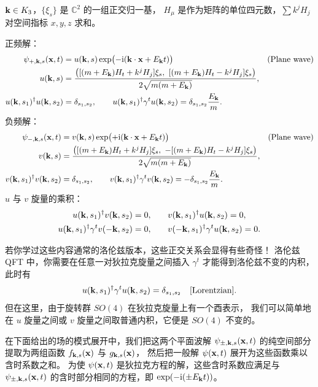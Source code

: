 \begin{keybox}
$\mathbf{k}\in K_{3}$，$\{\xi_{s}\}$ 是 $\mathbb{C}^{2}$ 的一组正交归一基，
$H_{\mu}$ 是作为矩阵的单位四元数，$\sum k^{j}H_{j}$ 对空间指标 $x,y,z$ 求和。

正频解：
\begin{align*}
\psi_{+,\mathbf{k},s}(\mathbf{x},t)&=u(\mathbf{k},s)\exp\bigl(-\mathrm{i}(\mathbf{k}\cdot\mathbf{x}+E_{\mathbf{k}}t)\bigr)
&&\text{(Plane wave)}\\
u(\mathbf{k},s)&=\frac{\bigl([(m+E_{\mathbf{k}})H_{t}+k^{j}H_{j}]\xi_{s},\
[(m+E_{\mathbf{k}})H_{t}-k^{j}H_{j}]\xi_{s}\bigr)}{2\sqrt{m(m+E_{\mathbf{k}})}},\\
u(\mathbf{k},s_{1})^{\dagger}u(\mathbf{k},s_{2})&=\delta_{s_{1},s_{2}},\qquad
u(\mathbf{k},s_{1})^{\dagger}\gamma^{t}u(\mathbf{k},s_{2})=\delta_{s_{1},s_{2}}\frac{E_{\mathbf{k}}}{m}.
\end{align*}
负频解：
\begin{align*}
\psi_{-,\mathbf{k},s}(\mathbf{x},t)&=v(\mathbf{k},s)\exp\bigl(+\mathrm{i}(\mathbf{k}\cdot\mathbf{x}+E_{\mathbf{k}}t)\bigr)
&&\text{(Plane wave)}\\
v(\mathbf{k},s)&=\frac{\bigl([(m+E_{\mathbf{k}})H_{t}+k^{j}H_{j}]\xi_{s},\
-[(m+E_{\mathbf{k}})H_{t}-k^{j}H_{j}]\xi_{s}\bigr)}{2\sqrt{m(m+E_{\mathbf{k}})}},\\
v(\mathbf{k},s_{1})^{\dagger}v(\mathbf{k},s_{2})&=\delta_{s_{1},s_{2}},\qquad
v(\mathbf{k},s_{1})^{\dagger}\gamma^{t}v(\mathbf{k},s_{2})=-\delta_{s_{1},s_{2}}\frac{E_{\mathbf{k}}}{m}.
\end{align*}
$u$ 与 $v$ 旋量的乘积：
\begin{align*}
u(\mathbf{k},s_{1})^{\dagger}v(\mathbf{k},s_{2})=0,&\qquad
v(\mathbf{k},s_{1})^{\dagger}u(\mathbf{k},s_{2})=0,\\
u(\mathbf{k},s_{1})^{\dagger}\gamma^{t}v(-\mathbf{k},s_{2})=0,&\qquad
v(-\mathbf{k},s_{1})^{\dagger}\gamma^{t}u(\mathbf{k},s_{2})=0 .
\end{align*}
\end{keybox}

若你学过这些内容通常的洛伦兹版本，这些正交关系会显得有些奇怪！
洛伦兹 QFT 中，你需要在任意一对狄拉克旋量之间插入 $\gamma^{t}$ 才能得到洛伦兹不变的内积，此时有
\begin{equation*}
u(\mathbf{k},s_{1})^{\dagger}\gamma^{t}u(\mathbf{k},s_{2})=\delta_{s_{1},s_{2}}\quad\text{[Lorentzian]}.
\end{equation*}
但在这里，由于旋转群 $SO(4)$ 在狄拉克旋量上有一个酉表示，
我们可以简单地在 $u$ 旋量之间或 $v$ 旋量之间取普通内积，它便是 $SO(4)$ 不变的。

在下面给出的场的模式展开中，我们把这两个平面波解 $\psi_{\pm,\mathbf{k},s}(\mathbf{x},t)$ 的纯空间部分
提取为两组函数 $f_{\mathbf{k},s}(\mathbf{x})$ 与 $g_{\mathbf{k},s}(\mathbf{x})$，
然后把一般解 $\psi(\mathbf{x},t)$ 展开为这些函数乘以含时系数之和。
为使 $\psi(\mathbf{x},t)$ 是狄拉克方程的解，这些含时系数应满足与 $\psi_{\pm,\mathbf{k},s}(\mathbf{x},t)$
的含时部分相同的方程，即 $\exp(-\mathrm{i}(\pm E_{\mathbf{k}}t))$。

